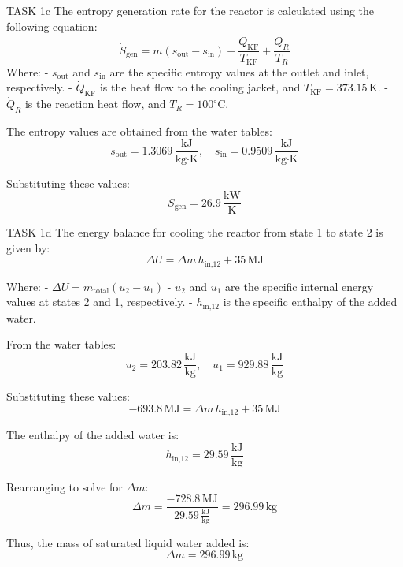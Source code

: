 TASK 1c  
The entropy generation rate for the reactor is calculated using the following equation:  
\[
\dot{S}_{\text{gen}} = \dot{m} \left( s_{\text{out}} - s_{\text{in}} \right) + \frac{\dot{Q}_{\text{KF}}}{T_{\text{KF}}} + \frac{\dot{Q}_R}{T_R}
\]  
Where:  
- \( s_{\text{out}} \) and \( s_{\text{in}} \) are the specific entropy values at the outlet and inlet, respectively.  
- \( \dot{Q}_{\text{KF}} \) is the heat flow to the cooling jacket, and \( T_{\text{KF}} = 373.15 \, \text{K} \).  
- \( \dot{Q}_R \) is the reaction heat flow, and \( T_R = 100^\circ\text{C} \).  

The entropy values are obtained from the water tables:  
\[
s_{\text{out}} = 1.3069 \, \frac{\text{kJ}}{\text{kg·K}}, \quad s_{\text{in}} = 0.9509 \, \frac{\text{kJ}}{\text{kg·K}}
\]  

Substituting these values:  
\[
\dot{S}_{\text{gen}} = 26.9 \, \frac{\text{kW}}{\text{K}}
\]  

TASK 1d  
The energy balance for cooling the reactor from state 1 to state 2 is given by:  
\[
\Delta U = \Delta m \, h_{\text{in,12}} + 35 \, \text{MJ}
\]  

Where:  
- \( \Delta U = m_{\text{total}} \left( u_2 - u_1 \right) \)  
- \( u_2 \) and \( u_1 \) are the specific internal energy values at states 2 and 1, respectively.  
- \( h_{\text{in,12}} \) is the specific enthalpy of the added water.  

From the water tables:  
\[
u_2 = 203.82 \, \frac{\text{kJ}}{\text{kg}}, \quad u_1 = 929.88 \, \frac{\text{kJ}}{\text{kg}}
\]  

Substituting these values:  
\[
-693.8 \, \text{MJ} = \Delta m \, h_{\text{in,12}} + 35 \, \text{MJ}
\]  

The enthalpy of the added water is:  
\[
h_{\text{in,12}} = 29.59 \, \frac{\text{kJ}}{\text{kg}}
\]  

Rearranging to solve for \( \Delta m \):  
\[
\Delta m = \frac{-728.8 \, \text{MJ}}{29.59 \, \frac{\text{kJ}}{\text{kg}}} = 296.99 \, \text{kg}
\]  

Thus, the mass of saturated liquid water added is:  
\[
\Delta m = 296.99 \, \text{kg}
\]